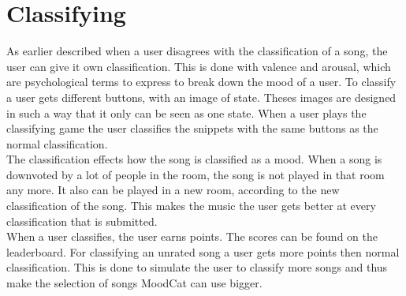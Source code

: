 \section{Classifying}
As earlier described when a user disagrees with the classification of a song, the user can give it own classification.
This is done with valence and arousal, which are psychological terms to express to break down the mood of a user.
To classify a user gets different buttons, with an image of state. Theses images are designed in such a way that it only can be seen as one state.
When a user plays the classifying game the user classifies the snippets with the same buttons as the normal classification.\\
The classification effects how the song is classified as a mood. When a song is downvoted by a lot of people in the room, the song is not played in that room any more. It also can be played in a new room, according to the new classification of the song. This makes the music the user gets better at every classification that is submitted. \\
When a user classifies, the user earns points. The scores can be found on the leaderboard. 
For classifying an unrated song a user gets more points then normal classification.   
This is done to simulate the user to classify more songs and thus make the selection of songs MoodCat can use bigger.